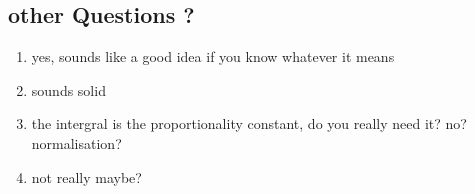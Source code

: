 \documentclass[a4paper,11pt]{article}
\begin{document}
\subsection*{other Questions ?}
\begin{enumerate}
	\item yes, sounds like a good idea if you know whatever it means
	\item sounds solid
	\item the intergral is the proportionality constant, do you really need it? no? normalisation?
	\item not really maybe?
	
\end{enumerate}
\end{document}
